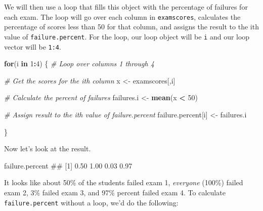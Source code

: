 \documentclass[]{book}
\newenvironment{Shaded}{\begin{snugshade}}{\end{snugshade}}
\newcommand{\KeywordTok}[1]{\textcolor[rgb]{0.13,0.29,0.53}{\textbf{#1}}}
\newcommand{\DecValTok}[1]{\textcolor[rgb]{0.00,0.00,0.81}{#1}}
\newcommand{\StringTok}[1]{\textcolor[rgb]{0.31,0.60,0.02}{#1}}
\newcommand{\CommentTok}[1]{\textcolor[rgb]{0.56,0.35,0.01}{\textit{#1}}}
\newcommand{\ControlFlowTok}[1]{\textcolor[rgb]{0.13,0.29,0.53}{\textbf{#1}}}
\newcommand{\OperatorTok}[1]{\textcolor[rgb]{0.81,0.36,0.00}{\textbf{#1}}}
\newcommand{\NormalTok}[1]{#1}
\theoremstyle{definition}
\theoremstyle{definition}
\theoremstyle{remark}
\begin{document}
We will then use a loop that fills this object with the percentage of
failures for each exam. The loop will go over each column in
\texttt{examscores}, calculates the percentage of scores less than 50
for that column, and assigns the result to the ith value of
\texttt{failure.percent}. For the loop, our loop object will be
\texttt{i} and our loop vector will be \texttt{1:4}.

\begin{Shaded}
\begin{Highlighting}[]
\ControlFlowTok{for}\NormalTok{(i }\ControlFlowTok{in} \DecValTok{1}\OperatorTok{:}\DecValTok{4}\NormalTok{) \{ }\CommentTok{# Loop over columns 1 through 4}

  \CommentTok{# Get the scores for the ith column}
\NormalTok{  x <-}\StringTok{ }\NormalTok{examscores[,i] }
  
  \CommentTok{# Calculate the percent of failures}
\NormalTok{  failures.i <-}\StringTok{ }\KeywordTok{mean}\NormalTok{(x }\OperatorTok{<}\StringTok{ }\DecValTok{50}\NormalTok{)  }
  
   \CommentTok{# Assign result to the ith value of failure.percent}
\NormalTok{  failure.percent[i] <-}\StringTok{ }\NormalTok{failures.i }

\NormalTok{\}}
\end{Highlighting}
\end{Shaded}

Now let's look at the result.

\begin{Shaded}
\begin{Highlighting}[]
\NormalTok{failure.percent}
\NormalTok{## [1] 0.50 1.00 0.03 0.97}
\end{Highlighting}
\end{Shaded}

It looks like about 50\% of the students failed exam 1, \emph{everyone}
(100\%) failed exam 2, 3\% failed exam 3, and 97\% percent failed exam
4. To calculate \texttt{failure.percent} without a loop, we'd do the
following:
\end{document}
